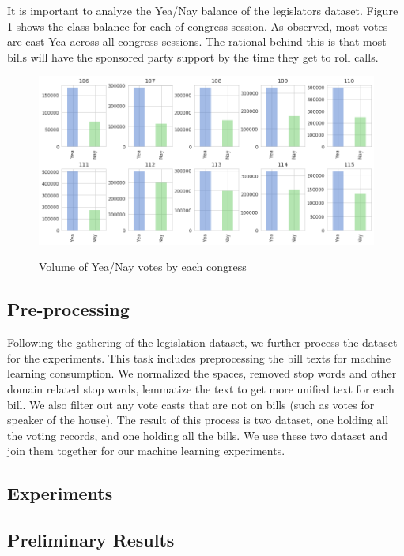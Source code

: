 It is important to analyze the Yea/Nay balance of the legislators dataset. Figure \ref{fig:congress-nay-yea} shows the class balance for each of congress session. As observed, most votes are cast Yea across all congress sessions. The rational behind this is that most bills will have the sponsored party support by the time they get to roll calls. 

\begin{figure}[H]
\centering
\caption{Volume of Yea/Nay votes by each congress}
\includegraphics[scale=.55]{img/congress-nay-yea.png}
\label{fig:congress-nay-yea}
\end{figure}


\subsection{Pre-processing}
Following the gathering of the legislation dataset, we further process the dataset for the experiments. This task includes preprocessing the bill texts for machine learning consumption. We normalized the spaces, removed stop words and other domain related stop words, lemmatize the text to get more unified text for each bill. We also filter out any vote casts that are not on bills (such as votes for speaker of the house). The result of this process is two dataset, one holding all the voting records, and one holding all the bills. We use these two dataset and join them together for our machine learning experiments. 


\subsection{Experiments}


\subsection{Preliminary Results}

